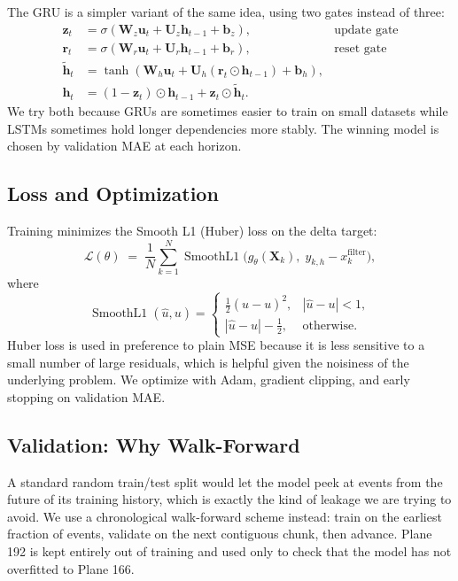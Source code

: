 \documentclass[11pt]{article}
\begin{document}
The GRU is a simpler variant of the same idea, using two gates instead
of three:
\begin{align}
\mathbf{z}_t &= \sigma(\mathbf{W}_z\mathbf{u}_t + \mathbf{U}_z\mathbf{h}_{t-1} + \mathbf{b}_z),
& \text{update gate} \\
\mathbf{r}_t &= \sigma(\mathbf{W}_r\mathbf{u}_t + \mathbf{U}_r\mathbf{h}_{t-1} + \mathbf{b}_r),
& \text{reset gate} \\
\widetilde{\mathbf{h}}_t &= \tanh(\mathbf{W}_h\mathbf{u}_t + \mathbf{U}_h(\mathbf{r}_t \odot \mathbf{h}_{t-1}) + \mathbf{b}_h), \\
\mathbf{h}_t &= (1-\mathbf{z}_t)\odot \mathbf{h}_{t-1} + \mathbf{z}_t \odot \widetilde{\mathbf{h}}_t.
\end{align}
We try both because GRUs are sometimes easier to train on small
datasets while LSTMs sometimes hold longer dependencies more stably.
The winning model is chosen by validation MAE at each horizon.

\subsection{Loss and Optimization}

Training minimizes the Smooth L1 (Huber) loss on the delta target:
\begin{equation}
\mathcal{L}(\theta) \;=\; \frac{1}{N}\sum_{k=1}^{N}\operatorname{SmoothL1}\!\big(g_\theta(\mathbf{X}_k),\; y_{k,h}-x^{\mathrm{filter}}_k\big),
\end{equation}
where
\begin{equation}
\operatorname{SmoothL1}(\widehat{u}, u) =
\begin{cases}
\tfrac{1}{2}(\widehat{u}-u)^{2}, & |\widehat{u}-u| < 1, \\
|\widehat{u}-u| - \tfrac{1}{2}, & \text{otherwise.}
\end{cases}
\end{equation}
Huber loss is used in preference to plain MSE because it is less
sensitive to a small number of large residuals, which is helpful given
the noisiness of the underlying problem. We optimize with Adam,
gradient clipping, and early stopping on validation MAE.

\subsection{Validation: Why Walk-Forward}

A standard random train/test split would let the model peek at events
from the future of its training history, which is exactly the kind of
leakage we are trying to avoid. We use a chronological walk-forward
scheme instead: train on the earliest fraction of events, validate on
the next contiguous chunk, then advance. Plane 192 is kept entirely
out of training and used only to check that the model has not
overfitted to Plane 166.
\end{document}
